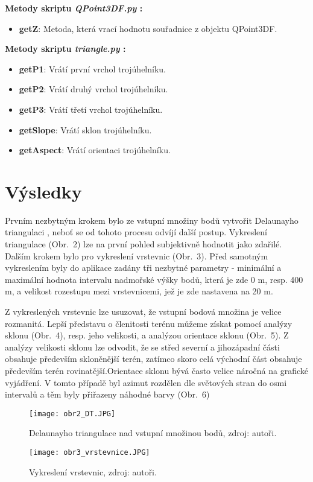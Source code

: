 \documentclass[a4paper,12pt]{article}
\begin{document}
{{{{{{{{{{{    \textbf{Metody skriptu \emph{QPoint3DF.py} :}
    \begin{itemize}
    \item \textbf{getZ}: Metoda, která vrací hodnotu souřadnice z objektu QPoint3DF.
    \end{itemize}

    \textbf{Metody skriptu \emph{triangle.py} :}
    \begin{itemize}
    \item \textbf{getP1}: Vrátí první vrchol trojúhelníku.
    \item \textbf{getP2}: Vrátí druhý vrchol trojúhelníku.
    \item \textbf{getP3}: Vrátí třetí vrchol trojúhelníku.
    \item \textbf{getSlope}: Vrátí sklon trojúhelníku.
    \item \textbf{getAspect}: Vrátí orientaci trojúhelníku.
    \end{itemize}

    \section{Výsledky}
    Prvním nezbytným krokem bylo ze vstupní množiny bodů vytvořit Delaunayho triangulaci , neboť se od tohoto procesu odvíjí další postup. Vykreslení triangulace (Obr.~2) lze na první pohled subjektivně hodnotit jako zdařilé. Dalším krokem bylo pro vykreslení vrstevnic (Obr.~3). Před samotným vykreslením byly do aplikace zadány tři nezbytné parametry - minimální a maximální hodnota intervalu nadmořské výšky bodů, která je zde 0 m, resp. 400 m, a velikost rozestupu mezi vrstevnicemi, jež je zde nastavena na 20 m.

    Z vykreslených vrstevnic lze usuzovat, že vstupní bodová množina je velice rozmanitá. Lepší představu o členitosti terénu můžeme získat pomocí analýzy sklonu (Obr.~4), resp. jeho velikosti, a analýzou orientace sklonu (Obr.~5). Z analýzy velikosti sklonu lze odvodit, že se střed severní a jihozápadní části obsahuje především skloněnější terén, zatímco skoro celá východní část obsahuje především terén rovinatější.Orientace sklonu bývá často velice náročná na grafické vyjádření. V tomto případě byl azimut rozdělen dle světových stran do osmi intervalů a těm byly přiřazeny náhodné barvy (Obr.~6)

    \begin{figure}[htbp]
    \texttt{[image: obr2\_DT.JPG]}
    \centering
    \caption{Delaunayho triangulace nad vstupní množinou bodů, zdroj: autoři.}
    \label{fig:obr2}
    \end{figure}
    \clearpage
    \begin{figure}[htbp]
    \texttt{[image: obr3\_vrstevnice.JPG]}
    \centering
    \caption{Vykreslení vrstevnic, zdroj: autoři.}
    \label{fig:obr3}
    

\end{figure}}}}}}}}}}}}
\end{document}

